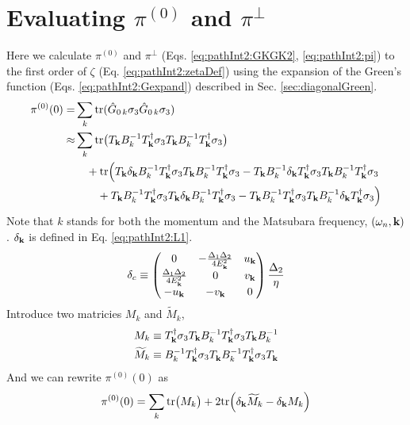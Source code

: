 \section{Evaluating $\pi^{(0)}$ and $\pi^{\perp}$\label{sec:calculatePi}}
Here we  calculate $\pi^{(0)}$ and $\pi^{\perp}$ (Eqs. \ref{eq:pathInt2:GKGK2}, \ref{eq:pathInt2:pi}) to the first order of $\zeta$ (Eq. \ref{eq:pathInt2:zetaDef}) using the expansion of the Green's function (Eqs. \ref{eq:pathInt2:Gexpand}) described in Sec. \ref{sec:diagonalGreen}.
\begin{equation}\label{eq:pathInt2:pi0long}
\begin{split}
\pi^{(0)}(0)=&\sum_k\text{tr}(\hat{G}_{0\,k}\sigma_3\hat{G}_{0\,k}\sigma_3)\\
	\approx&\sum_k\text{tr}\big(T_{\mathbf{k}}B_{k}^{-1}T_{\mathbf{k}}^{\dagger}\sigma_3T_{\mathbf{k}}B_{k}^{-1}T_{\mathbf{k}}^{\dagger}\sigma_3\big)\\
	&\quad+\text{tr}\Big(T_{\mathbf{k}}\delta_{\mathbf{k}}B_{k}^{-1}T_{\mathbf{k}}^{\dagger}\sigma_3T_{\mathbf{k}}B_{k}^{-1}T_{\mathbf{k}}^{\dagger}\sigma_3
	-T_{\mathbf{k}}B_{k}^{-1}\delta_{\mathbf{k}}T_{\mathbf{k}}^{\dagger}\sigma_3T_{\mathbf{k}}B_{k}^{-1}T_{\mathbf{k}}^{\dagger}\sigma_3\\
	&\qquad+T_{\mathbf{k}}B_{k}^{-1}T_{\mathbf{k}}^{\dagger}\sigma_3T_{\mathbf{k}}\delta_{\mathbf{k}}B_{k}^{-1}T_{\mathbf{k}}^{\dagger}\sigma_3
	-T_{\mathbf{k}}B_{k}^{-1}T_{\mathbf{k}}^{\dagger}\sigma_3T_{\mathbf{k}}B_{k}^{-1}\delta_{\mathbf{k}}T_{\mathbf{k}}^{\dagger}\sigma_3\Big)
	\end{split}
\end{equation}
Note that $k$ stands for both the momentum and  the Matsubara frequency, $(\omega_{n},\mathbf{k})$. $\delta_{\mathbf{k}}$ is defined in Eq. \ref{eq:pathInt2:L1}. 
\begin{equation*}
\delta_{c}\equiv\begin{pmatrix}0&-\frac{\Delta_{1}{}\Delta_{2}{}}{4E^{2}_{\mathbf{k}}}&u_{\mathbf{k}}\\
\frac{\Delta_{1}{}\Delta_{2}{}}{4E^{2}_{\mathbf{k}}}&0&v_{\mathbf{k}}\\
-u_{\mathbf{k}}&-v_{\mathbf{k}}&0
\end{pmatrix}\frac{\Delta_{2}{}}{\eta}
\end{equation*}
Introduce two matricies $M_{k}$ and $\widetilde{M}_{k}$, 
\begin{gather}
M_{k}\equiv{}T_{\mathbf{k}}^{\dagger}\sigma_3T_{\mathbf{k}}B_{k}^{-1}T_{\mathbf{k}}^{\dagger}\sigma_3T_{\mathbf{k}}B_{k}^{-1}\\
\widetilde{M}_{k}\equiv{}B_{k}^{-1}T_{\mathbf{k}}^{\dagger}\sigma_3T^{}_{\mathbf{k}}B_{k}^{-1}T_{\mathbf{k}}^{\dagger}\sigma_3T^{}_{\mathbf{k}}
\end{gather}
And we can rewrite $\pi^{(0)}(0)$ as
\begin{equation}
\pi^{(0)}(0)=\sum_k\text{tr}\big({M}_{k}\big)+2\text{tr}\Big(\delta_{\mathbf{k}}\widetilde{M}_{k}-\delta_{\mathbf{k}}M_{k}\Big)
\end{equation}
